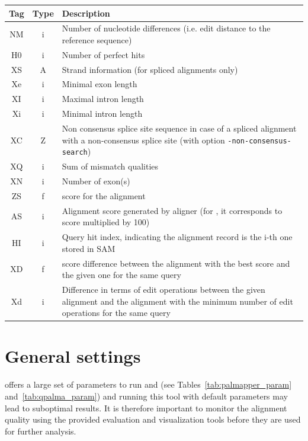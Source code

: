 \documentclass{article}
\begin{document}
\begin{tabular}{|c|c|p{12cm}|}
\hline
{\bf Tag}&{\bf Type}&{\bf Description}\\
\hline
NM&i&Number of nucleotide differences (i.e. edit distance to the reference sequence)\\
\hline
H0&i&Number of perfect hits\\
\hline
XS&A&Strand information (for spliced alignments only)\\
\hline
Xe&i&Minimal exon length\\
\hline
XI&i&Maximal intron length\\
\hline
Xi&i&Minimal intron length\\
\hline
XC&Z&Non consensus splice site sequence in case of a spliced alignment
with a non-consensus splice site (with option \texttt{-non-consensus-search}) \\
\hline
XQ&i&Sum of mismatch qualities\\
\hline
XN&i&Number of exon(s)\\
\hline
ZS&f&\QP{} score for the alignment\\
\hline
AS&i&Alignment score generated by aligner (for \PALMapper{}, it
corresponds to \QP{} score multiplied by 100)\\
\hline
HI&i&Query hit index, indicating the alignment record is the i-th one stored in SAM\\
\hline
XD&f& \QP{} score difference between the alignment with the best
\QP{} score and the given one for the same query\\
\hline
Xd&i&Difference in terms of edit operations between the given
alignment and the alignment with the minimum number of edit operations
for the same query\\
\hline
\end{tabular}



\section{General settings}
\label{sec:settings}

\PALMapper{} offers a large set of parameters to run \GM{} and \QP{}
(see Tables~\ref{tab:palmapper_param} and~\ref{tab:qpalma_param}) and
running this tool with default parameters may lead to suboptimal
results. It is therefore important to monitor the alignment quality
using the provided evaluation and visualization tools before they are
used for further analysis. 
\end{document}
